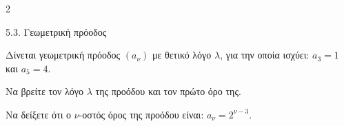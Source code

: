 \begin{ylh}{2}
    \item 5.3. Γεωμετρική πρόοδος
\end{ylh}
Δίνεται γεωμετρική πρόοδος $(a_\nu)$ με θετικό λόγο $\lambda$, για την οποία ισχύει: $a_3 = 1$ και $a_5 = 4$.

\begin{alist}
\item Να βρείτε τον λόγο $\lambda$ της προόδου και τον πρώτο όρο της.
\item Να δείξετε ότι ο $\nu$-οστός όρος της προόδου είναι: $a_\nu = 2^{\nu - 3}$.
\end{alist}

